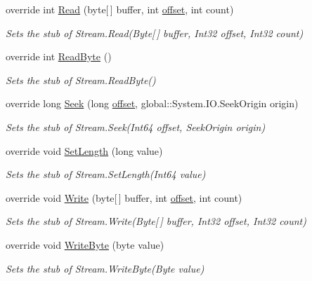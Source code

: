 \begin{DoxyCompactItemize}
override int \hyperlink{class_system_1_1_i_o_1_1_fakes_1_1_stub_stream_a2d306386744e8c69c4ffbf0abcfdb0b3}{Read} (byte\mbox{[}$\,$\mbox{]} buffer, int \hyperlink{jquery-1_810_82_8js_a4a9f594d20d927164551fc7fa4751a2f}{offset}, int count)
\begin{DoxyCompactList}\small\item\em Sets the stub of Stream.\-Read(\-Byte\mbox{[}$\,$\mbox{]} buffer, Int32 offset, Int32 count)\end{DoxyCompactList}\item 
override int \hyperlink{class_system_1_1_i_o_1_1_fakes_1_1_stub_stream_a3c8e9ab8be02c5e73ef98b779c06a7e8}{Read\-Byte} ()
\begin{DoxyCompactList}\small\item\em Sets the stub of Stream.\-Read\-Byte()\end{DoxyCompactList}\item 
override long \hyperlink{class_system_1_1_i_o_1_1_fakes_1_1_stub_stream_a41e88606e73be78cbabf9c6fdd6c6956}{Seek} (long \hyperlink{jquery-1_810_82_8js_a4a9f594d20d927164551fc7fa4751a2f}{offset}, global\-::\-System.\-I\-O.\-Seek\-Origin origin)
\begin{DoxyCompactList}\small\item\em Sets the stub of Stream.\-Seek(\-Int64 offset, Seek\-Origin origin)\end{DoxyCompactList}\item 
override void \hyperlink{class_system_1_1_i_o_1_1_fakes_1_1_stub_stream_a6b622f52840bb4ce69e5496b57eb52c2}{Set\-Length} (long value)
\begin{DoxyCompactList}\small\item\em Sets the stub of Stream.\-Set\-Length(\-Int64 value)\end{DoxyCompactList}\item 
override void \hyperlink{class_system_1_1_i_o_1_1_fakes_1_1_stub_stream_a8572cedc68f523df001ddfdbcc9a5a87}{Write} (byte\mbox{[}$\,$\mbox{]} buffer, int \hyperlink{jquery-1_810_82_8js_a4a9f594d20d927164551fc7fa4751a2f}{offset}, int count)
\begin{DoxyCompactList}\small\item\em Sets the stub of Stream.\-Write(\-Byte\mbox{[}$\,$\mbox{]} buffer, Int32 offset, Int32 count)\end{DoxyCompactList}\item 
override void \hyperlink{class_system_1_1_i_o_1_1_fakes_1_1_stub_stream_a2cdab94a39d473b5423a2f6f90c99f63}{Write\-Byte} (byte value)
\begin{DoxyCompactList}\small\item\em Sets the stub of Stream.\-Write\-Byte(\-Byte value)\end{DoxyCompactList}\end{DoxyCompactItemize}
